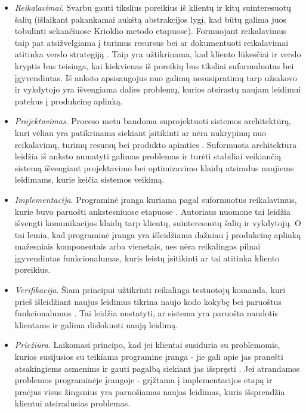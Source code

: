 \documentclass{VUMIFPSkursinis}
\begin{document}
\begin{itemize}
  \item \textit{Reikalavimai}. Svarbu gauti tikslius poreikius iš klientų ir kitų suinteresuotų šalių (išlaikant pakankamai aukštą abstrakcijos lygį, kad būtų galima juos tobulinti sekančiuose Krioklio metodo etapuose). Formuojant reikalavimus taip pat atsižvelgiama į turimus resursus bei ar dokumentuoti reikalavimai atitinka verslo strategiją \cite{SaltKetvirtas}. Taip yra užtikrinama, kad kliento lūkesčiai ir verslo kryptis bus teisinga, kai kiekvienas iš poreikių bus tiksliai suformuluotas bei įgyvendintas. Iš anksto apsisaugojus nuo galimų nesusipratimų tarp užsakovo ir vykdytojo yra išvengiama dalies problemų, kurios atsirastų naujam leidimui patekus į produkcinę aplinką.

  \item \textit{Projektavimas}. Proceso metu bandoma suprojektuoti sistemos architektūrą, kuri vėliau yra patikrinama siekiant įsitikinti ar nėra nukrypimų nuo reikalavimų, turimų resursų bei produkto apimties \cite{SaltKetvirtas}. Suformuota architektūra leidžia iš anksto numatyti galimas problemas ir turėti stabiliai veikiančią sistemą išvengiant projektavimo bei optimizavimo klaidų atsiradus naujiems leidimams, kurie keičia sistemos veikimą. 
  
  \item \textit{Implementacija}. Programinė įranga kuriama pagal suformuotus reikalavimus, kurie buvo paruošti ankstesniuose etapuose \cite{SaltPenktas}.  Autoriaus nuomone tai leidžia išvengti komunikacijos klaidų tarp klientų, suinteresuotų šalių ir vykdytojų. O tai lemia, kad programinė įranga yra išleidžiama dažniau į produkcinę aplinką mažesniais komponentais arba vienetais, nes nėra reikalingas pilnai įgyvendintas funkcionalumas, kuris leistų įsitikinti ar tai atitinka kliento poreikius.
  
  \item \textit{Verifikacija}. Šiam principui užtikrinti reikalinga testuotojų komanda, kuri prieš išleidžiant naujus leidimus tikrina naujo kodo kokybę bei paruoštus funkcionalumus \cite{SaltKetvirtas}. Tai leidžia nustatyti, ar sistema yra paruošta naudotis klientams ir galima dislokuoti naują leidimą.
  
  \item \textit{Priežiūra}. Laikomasi principo, kad jei klientai susiduria su problemomis, kurios susijusios su teikiama programine įranga - jie gali apie jas pranešti atsakingiems asmenims ir gauti pagalbą siekiant jas išspręsti \cite{SaltKetvirtas}. Jei atrandamos problemos programinėje įrangoje - grįžtama į implementacijos etapą ir praėjus visus žingsnius yra paruošiamas naujas leidimas, kuris išsprendžia klientui atsiradusias problemas.
\end{itemize}
\end{document}
